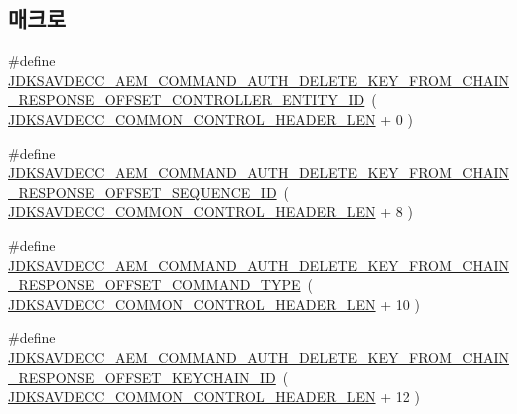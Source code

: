\subsection*{매크로}
\begin{DoxyCompactItemize}
\item 
\#define \hyperlink{group__command__auth__delete__key__from__chain__response_ga9c6652ee9d97b2e032ef63bd09326c15}{J\+D\+K\+S\+A\+V\+D\+E\+C\+C\+\_\+\+A\+E\+M\+\_\+\+C\+O\+M\+M\+A\+N\+D\+\_\+\+A\+U\+T\+H\+\_\+\+D\+E\+L\+E\+T\+E\+\_\+\+K\+E\+Y\+\_\+\+F\+R\+O\+M\+\_\+\+C\+H\+A\+I\+N\+\_\+\+R\+E\+S\+P\+O\+N\+S\+E\+\_\+\+O\+F\+F\+S\+E\+T\+\_\+\+C\+O\+N\+T\+R\+O\+L\+L\+E\+R\+\_\+\+E\+N\+T\+I\+T\+Y\+\_\+\+ID}~( \hyperlink{group__jdksavdecc__avtp__common__control__header_gaae84052886fb1bb42f3bc5f85b741dff}{J\+D\+K\+S\+A\+V\+D\+E\+C\+C\+\_\+\+C\+O\+M\+M\+O\+N\+\_\+\+C\+O\+N\+T\+R\+O\+L\+\_\+\+H\+E\+A\+D\+E\+R\+\_\+\+L\+EN} + 0 )
\item 
\#define \hyperlink{group__command__auth__delete__key__from__chain__response_ga09307a77cd57748f82da096ecdab566b}{J\+D\+K\+S\+A\+V\+D\+E\+C\+C\+\_\+\+A\+E\+M\+\_\+\+C\+O\+M\+M\+A\+N\+D\+\_\+\+A\+U\+T\+H\+\_\+\+D\+E\+L\+E\+T\+E\+\_\+\+K\+E\+Y\+\_\+\+F\+R\+O\+M\+\_\+\+C\+H\+A\+I\+N\+\_\+\+R\+E\+S\+P\+O\+N\+S\+E\+\_\+\+O\+F\+F\+S\+E\+T\+\_\+\+S\+E\+Q\+U\+E\+N\+C\+E\+\_\+\+ID}~( \hyperlink{group__jdksavdecc__avtp__common__control__header_gaae84052886fb1bb42f3bc5f85b741dff}{J\+D\+K\+S\+A\+V\+D\+E\+C\+C\+\_\+\+C\+O\+M\+M\+O\+N\+\_\+\+C\+O\+N\+T\+R\+O\+L\+\_\+\+H\+E\+A\+D\+E\+R\+\_\+\+L\+EN} + 8 )
\item 
\#define \hyperlink{group__command__auth__delete__key__from__chain__response_ga60f8943635f83e472fc1d983674b0e5e}{J\+D\+K\+S\+A\+V\+D\+E\+C\+C\+\_\+\+A\+E\+M\+\_\+\+C\+O\+M\+M\+A\+N\+D\+\_\+\+A\+U\+T\+H\+\_\+\+D\+E\+L\+E\+T\+E\+\_\+\+K\+E\+Y\+\_\+\+F\+R\+O\+M\+\_\+\+C\+H\+A\+I\+N\+\_\+\+R\+E\+S\+P\+O\+N\+S\+E\+\_\+\+O\+F\+F\+S\+E\+T\+\_\+\+C\+O\+M\+M\+A\+N\+D\+\_\+\+T\+Y\+PE}~( \hyperlink{group__jdksavdecc__avtp__common__control__header_gaae84052886fb1bb42f3bc5f85b741dff}{J\+D\+K\+S\+A\+V\+D\+E\+C\+C\+\_\+\+C\+O\+M\+M\+O\+N\+\_\+\+C\+O\+N\+T\+R\+O\+L\+\_\+\+H\+E\+A\+D\+E\+R\+\_\+\+L\+EN} + 10 )
\item 
\#define \hyperlink{group__command__auth__delete__key__from__chain__response_gaf36fe9443e53b439212c599f8a186ca5}{J\+D\+K\+S\+A\+V\+D\+E\+C\+C\+\_\+\+A\+E\+M\+\_\+\+C\+O\+M\+M\+A\+N\+D\+\_\+\+A\+U\+T\+H\+\_\+\+D\+E\+L\+E\+T\+E\+\_\+\+K\+E\+Y\+\_\+\+F\+R\+O\+M\+\_\+\+C\+H\+A\+I\+N\+\_\+\+R\+E\+S\+P\+O\+N\+S\+E\+\_\+\+O\+F\+F\+S\+E\+T\+\_\+\+K\+E\+Y\+C\+H\+A\+I\+N\+\_\+\+ID}~( \hyperlink{group__jdksavdecc__avtp__common__control__header_gaae84052886fb1bb42f3bc5f85b741dff}{J\+D\+K\+S\+A\+V\+D\+E\+C\+C\+\_\+\+C\+O\+M\+M\+O\+N\+\_\+\+C\+O\+N\+T\+R\+O\+L\+\_\+\+H\+E\+A\+D\+E\+R\+\_\+\+L\+EN} + 12 )

\end{DoxyCompactItemize}
